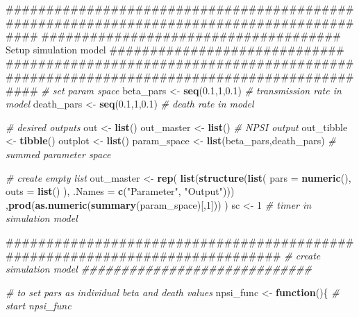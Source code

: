 \documentclass[10,portrait]{article}
\newenvironment{Shaded}{\begin{snugshade}}{\end{snugshade}}
\newcommand{\KeywordTok}[1]{\textcolor[rgb]{0.13,0.29,0.53}{\textbf{#1}}}
\newcommand{\DataTypeTok}[1]{\textcolor[rgb]{0.13,0.29,0.53}{#1}}
\newcommand{\DecValTok}[1]{\textcolor[rgb]{0.00,0.00,0.81}{#1}}
\newcommand{\FloatTok}[1]{\textcolor[rgb]{0.00,0.00,0.81}{#1}}
\newcommand{\StringTok}[1]{\textcolor[rgb]{0.31,0.60,0.02}{#1}}
\newcommand{\CommentTok}[1]{\textcolor[rgb]{0.56,0.35,0.01}{\textit{#1}}}
\newcommand{\ControlFlowTok}[1]{\textcolor[rgb]{0.13,0.29,0.53}{\textbf{#1}}}
\newcommand{\NormalTok}[1]{#1}
\begin{document}
\begin{Shaded}
\begin{Highlighting}[]
\NormalTok{##########################################################################################}
\NormalTok{##################################### Setup simulation model #############################}
\NormalTok{##########################################################################################}
\CommentTok{# set param space}
\NormalTok{beta_pars <-}\StringTok{ }\KeywordTok{seq}\NormalTok{(}\FloatTok{0.1}\NormalTok{,}\DecValTok{1}\NormalTok{,}\FloatTok{0.1}\NormalTok{) }\CommentTok{# transmission rate in model }
\NormalTok{death_pars <-}\StringTok{ }\KeywordTok{seq}\NormalTok{(}\FloatTok{0.1}\NormalTok{,}\DecValTok{1}\NormalTok{,}\FloatTok{0.1}\NormalTok{) }\CommentTok{# death rate in model}

\CommentTok{# desired outputs}
\NormalTok{out <-}\StringTok{ }\KeywordTok{list}\NormalTok{()}
\NormalTok{out_master <-}\StringTok{ }\KeywordTok{list}\NormalTok{() }\CommentTok{# NPSI output }
\NormalTok{out_tibble <-}\StringTok{ }\KeywordTok{tibble}\NormalTok{()}
\NormalTok{outplot <-}\StringTok{ }\KeywordTok{list}\NormalTok{()}
\NormalTok{param_space <-}\StringTok{ }\KeywordTok{list}\NormalTok{(beta_pars,death_pars) }\CommentTok{# summed parameter space }

\CommentTok{# create empty list}
\NormalTok{out_master <-}\StringTok{ }\KeywordTok{rep}\NormalTok{(}
  \KeywordTok{list}\NormalTok{(}\KeywordTok{structure}\NormalTok{(}\KeywordTok{list}\NormalTok{(}
    \DataTypeTok{pars =} \KeywordTok{numeric}\NormalTok{(), }
    \DataTypeTok{outs =} \KeywordTok{list}\NormalTok{()}
\NormalTok{    ),}
    \DataTypeTok{.Names =} \KeywordTok{c}\NormalTok{(}\StringTok{"Parameter"}\NormalTok{, }\StringTok{"Output"}\NormalTok{)))}
\NormalTok{    ,}\KeywordTok{prod}\NormalTok{(}\KeywordTok{as.numeric}\NormalTok{(}\KeywordTok{summary}\NormalTok{(param_space)[,}\DecValTok{1}\NormalTok{]))}
\NormalTok{  )}
\NormalTok{sc <-}\StringTok{ }\DecValTok{1} \CommentTok{# timer in simulation model }

\NormalTok{#############################################################################}
\CommentTok{# create simulation model  #############################}

\CommentTok{# to set pars as individual beta and death values}
\NormalTok{npsi_func <-}\StringTok{ }\ControlFlowTok{function}\NormalTok{()\{ }\CommentTok{# start npsi_func}
  

\end{Highlighting}
\end{Shaded}
\end{document}
